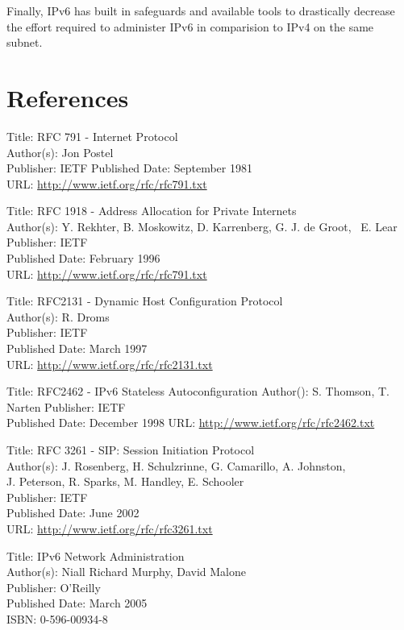 \documentclass[a4paper,12pt]{article}
\begin{document}
Finally, IPv6 has built in safeguards and available tools to drastically
decrease the effort required to administer IPv6 in comparision
to IPv4 on the same subnet.

\section{References}

Title: RFC 791 - Internet Protocol \\
Author(s): Jon Postel \\
Publisher: IETF
Published Date: September 1981 \\
URL: \url{http://www.ietf.org/rfc/rfc791.txt}	 

Title: RFC 1918 - Address Allocation for Private Internets \\
Author(s): Y. Rekhter, B. Moskowitz, D. Karrenberg, G. J. de Groot, \
\indent E. Lear \\
Publisher: IETF \\
Published Date: February 1996  \\
URL: \url{http://www.ietf.org/rfc/rfc791.txt}	 

Title: RFC2131 - Dynamic Host Configuration Protocol \\
Author(s): R. Droms \\
Publisher: IETF \\
Published Date: March 1997 \\
URL: \url{http://www.ietf.org/rfc/rfc2131.txt}	 

Title: RFC2462 - IPv6 Stateless Autoconfiguration
Author(): S. Thomson, T. Narten
Publisher: IETF \\
Published Date: December 1998
URL: \url{http://www.ietf.org/rfc/rfc2462.txt}	 

Title: RFC 3261 - SIP: Session Initiation Protocol \\
Author(s): J. Rosenberg, H. Schulzrinne, G. Camarillo, A. Johnston, \\
\indent J. Peterson, R. Sparks, M. Handley, E. Schooler \\
Publisher: IETF \\
Published Date: June 2002  \\
URL: \url{http://www.ietf.org/rfc/rfc3261.txt}	 

Title: IPv6 Network Administration \\
Author(s): Niall Richard Murphy, David Malone \\
Publisher: O'Reilly \\
Published Date: March 2005  \\
ISBN: 0-596-00934-8	 
\end{document}
